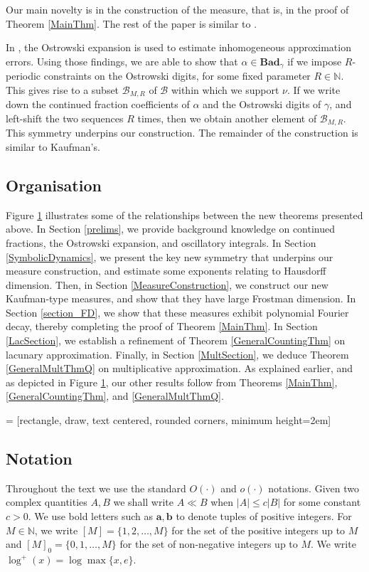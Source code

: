 \documentclass[12pt, reqno]{amsart}
\theoremstyle{definition}
\theoremstyle{remark}
\numberwithin{equation}{section}
\def\alp{{\alpha}} \def\bfalp{{\boldsymbol \alpha}}
\def\gam{{\gamma}} \def\Gam{{\Gamma}}
\def\ls{\leqslant} \def\gs{\geqslant}
\def \bN {\mathbb N}
\def \ba {\mathbf a}
\def \bb {\mathbf b}
\def \cB {\mathcal B}
\def \Bad {{\mathrm{\mathbf{Bad}}}}
\begin{document}
	Our main novelty is in the construction of the measure, that is, in the proof of Theorem \ref{MainThm}. The rest of the paper is similar to \cite{PVZZ2022}. 
	
	In \cite[\S 4]{BHV}, the Ostrowski expansion is used to estimate inhomogeneous approximation errors. Using those findings, we are able to show that $\alp \in \Bad_\gam$ if we impose $R$-periodic constraints on the Ostrowski digits, for some fixed parameter $R \in \bN$. This gives rise to a subset $\cB_{M,R}$ of $\cB$ within which we support $\nu$. If we write down the continued fraction coefficients of $\alp$ and the Ostrowski digits of $\gam$, and left-shift the two sequences $R$ times, then we obtain another element of $\cB_{M,R}$. This symmetry underpins our construction. The remainder of the construction is similar to Kaufman's.
	
	\subsection*{Organisation}
	
	Figure \ref{Leitfaden} illustrates some of the relationships between the new theorems presented above. In Section \ref{prelims}, we provide background knowledge on continued fractions, the Ostrowski expansion, and oscillatory integrals. In Section \ref{SymbolicDynamics}, we present the key new symmetry that underpins our measure construction, and estimate some exponents relating to Hausdorff dimension. Then, in Section \ref{MeasureConstruction}, we construct our new Kaufman-type measures, and show that they have large Frostman dimension. In Section \ref{section_FD}, we show that these measures exhibit polynomial Fourier decay, thereby completing the proof of Theorem \ref{MainThm}. In Section \ref{LacSection}, we establish a refinement of Theorem \ref{GeneralCountingThm} on lacunary approximation. Finally, in Section \ref{MultSection}, we deduce Theorem \ref{GeneralMultThmQ} on multiplicative approximation. As explained earlier, and as depicted in Figure \ref{Leitfaden}, our other results follow from Theorems \ref{MainThm}, \ref{GeneralCountingThm}, and \ref{GeneralMultThmQ}.
	
	 = [rectangle, draw, text centered, rounded corners, minimum height=2em]
	\begin{figure}[omitted: a diagram of this paper's results, not reproduced here]\label{Leitfaden}\end{figure}
	
	\subsection*{Notation}
	Throughout the text we use the standard $O(\cdot)$ and $o(\cdot)$ notations. Given two complex quantities $A,B$ we shall write $A \ll B$ when  $|A| \ls c |B|$ for some constant $c>0$. We use bold letters such as $\ba, \bb$ to denote tuples of positive integers. For $M \in \bN$, we write $[M] =
	\{1,2,\ldots,M\}$ for the set of the positive integers up to $M$ and $[M]_0 = \{0,1,\ldots, M\}$ for the set of non-negative integers up to $M.$ We write
	$\log^+(x) = \log \max \{x, e \}$.
	
\end{document}
